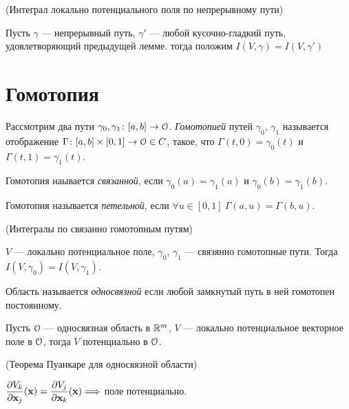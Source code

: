 \begin{definition}(Интеграл локально потенциального поля по непрерывному пути)

    Пусть $\gamma$ --- непрерывный путь, $\gamma'$ --- любой кусочно-гладкий путь,
    удовлетворяющий предыдущей лемме. тогда положим $I(V, \gamma) = I(V, \gamma')$
\end{definition}


\section{Гомотопия}

\begin{definition}
    Рассмотрим два пути $\gamma_0, \gamma_1 \colon [a, b] \to \mathcal{O}$.
    \textit{Гомотопией} путей $\gamma_0$, $\gamma_1$ называется отображение $\Gamma
    \colon [a, b] \times [0, 1] \to \mathcal{O} \in C$, такое, что $\Gamma(t, 0) =
    \gamma_0(t)$ и $\Gamma(t, 1) = \gamma_1(t)$.
\end{definition}

\begin{definition}
    Гомотопия наывается \textit{связанной}, если $\gamma_0(a) = \gamma_1(a)$ и
    $\gamma_0(b) = \gamma_1(b)$.
\end{definition}

\begin{definition}
    Гомотопия называется \textit{петельной}, если $\forall u \in [0, 1]~
    \Gamma(a, u) = \Gamma(b, u)$.
\end{definition}

\begin{theorem}(Интегралы по связанно гомотопным путям)

    $V$ --- локально потенциальное поле, $\gamma_0$, $\gamma_1$ --- связянно
    гомотопные пути. Тогда $I(V, \gamma_0) = I(V, \gamma_1)$.
\end{theorem}

\begin{definition}
    Область называется \textit{односвязной} если любой замкнутый путь в ней
    гомотопен постоянному.
\end{definition}

\begin{theorem}

    Пусть $\mathcal{O}$ --- односвязная область в $\mathbb{R}^m$, $V$ --- локально потенциальное
    векторное поле в $\mathcal{O}$, тогда $V$ потенциально в $\mathcal{O}$.
\end{theorem}

\begin{corollary}(Теорема Пуанкаре для односвязной области)
    
    $\dfrac{\partial V_k}{\partial \mathbf{x}_j}(\mathbf{x}) = \dfrac{\partial V_j}{\partial \mathbf{x}_k}(\mathbf{x}) \Longrightarrow$ поле потенциально.
\end{corollary}
